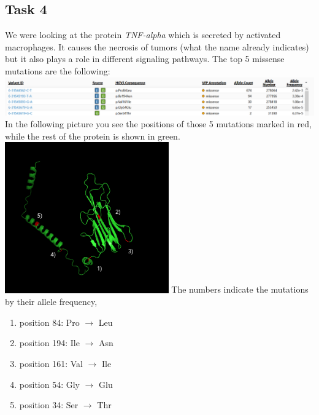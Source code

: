 \documentclass[]{article}
\begin{document}
\subsection{Task 4}
We were looking at the protein \textit{TNF-alpha} which is secreted by activated macrophages. It causes the necrosis of tumors (what the name already indicates) but it also plays a role in different signaling pathways.\newline
The top 5 missense mutations are the following:\newline
\includegraphics[height=15ex, width=450pt]{mutations.png}
\newline
\newline
In the following picture you see the positions of those 5 mutations marked in red, while the rest of the protein is shown in green.\newline
\includegraphics[height=40ex, width=200pt]{mutation_3d_small.png}
\newline
\newline
The numbers indicate the mutations by their allele frequency,
\begin{enumerate}[1)]
	\item position  84: Pro $\rightarrow$ Leu
	\item position 194: Ile $\rightarrow$ Asn
	\item position 161: Val $\rightarrow$ Ile
	\item position  54: Gly $\rightarrow$ Glu
	\item position  34: Ser $\rightarrow$ Thr
\end{enumerate}
\end{document}
